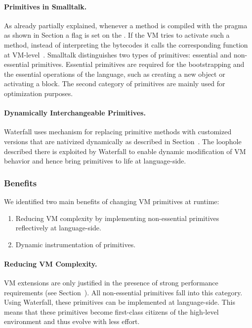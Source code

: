 \paragraph{Primitives in Smalltalk.}
As already partially explained, whenever a method is compiled with the  pragma as shown in Section  a flag is set on the . 
If the VM tries to activate such a method, instead of interpreting the bytecodes it calls the corresponding function at VM-level~\cite{Gold83a}.
Smalltalk distinguishes two types of primitives: essential and non-essential primitives.
Essential primitives are required for the bootstrapping and the essential operations of the language, such as creating a new object or activating a block.
The second category of primitives are mainly used for optimization purposes.

\paragraph{Dynamically Interchangeable Primitives.}
Waterfall uses \Bs mechanism for replacing primitive methods with customized versions that are nativized dynamically as described in Section~.
The loophole described there is exploited by Waterfall to enable dynamic modification of VM behavior and hence bring primitives to life at language-side.


\subsubsection{Benefits} 
We identified two main benefits of changing VM primitives at runtime:

\begin{enumerate}
	\item Reducing VM complexity by implementing non-essential primitives reflectively at language-side.
	\item Dynamic instrumentation of primitives.
\end{enumerate}

\paragraph{Reducing VM Complexity.}
VM extensions are only justified in the presence of strong performance requirements (see Section~).
All non-essential primitives fall into this category.
Using Waterfall, these primitives can be implemented at language-side.
This means that these primitives become first-class citizens of the high-level environment and thus evolve with less effort.

